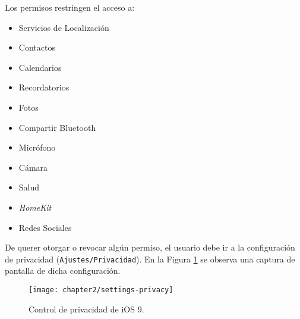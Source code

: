Los permisos restringen el acceso a:
\begin{multicols}{2}
    \begin{itemize}
        \item Servicios de Localización
        \item Contactos
        \item Calendarios
        \item Recordatorios
        \item Fotos
        \item Compartir Bluetooth
        \item Micrófono
        \item Cámara
        \item Salud
        \item \textit{HomeKit}
        \item Redes Sociales
    \end{itemize} 
\end{multicols}

De querer otorgar o revocar algún permiso, el usuario debe ir a la configuración de privacidad (\texttt{Ajustes/Privacidad}). En la Figura \ref{fig:ch02:permissions-capture} se observa una captura de pantalla de dicha configuración.
\begin{figure}[hbtp]
    \centering
    \texttt{[image: chapter2/settings-privacy]}
    \caption{Control de privacidad de iOS 9.}
	\label{fig:ch02:permissions-capture}
\end{figure}